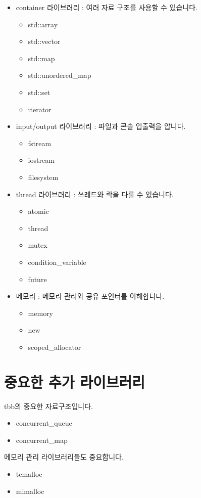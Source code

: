 \begin{itemize}
    \item container 라이브러리 : 여러 자료 구조를 사용할 수 있습니다. 
    \begin{itemize}
        \item std::array 
        \item std::vector 
        \item std::map
        \item std::unordered\_map 
        \item std::set 
        \item iterator
    \end{itemize}
    \item input/output 라이브러리 :  파일과 콘솔 입출력을 압니다. 
    \begin{itemize}
        \item fstream 
        \item iostream 
        \item filesystem
    \end{itemize}
    \item thread 라이브러리 : 쓰레드와 락을 다룰 수 있습니다. 
    \begin{itemize}
        \item atomic 
        \item thread
        \item mutex
        \item condition\_variable
        \item future 
    \end{itemize}
    \item 메모리 : 메모리 관리와 공유 포인터를 이해합니다. 
    \begin{itemize}
        \item memory 
        \item new 
        \item scoped\_allocator
    \end{itemize}
\end{itemize}

\section{중요한 추가 라이브러리}

tbb의 중요한 자료구조입니다. 

\begin{itemize}
    \item concurrent\_queue
    \item concurrent\_map 
\end{itemize}

메모리 관리 라이브러리들도 중요합니다. 

\begin{itemize}
    \item tcmalloc 
    \item mimalloc
\end{itemize}





